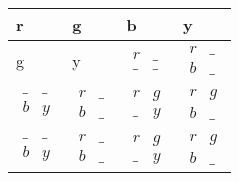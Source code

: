 \documentclass[a4paper]{article}
\begin{document}
\begin{tabular}{|l|l|l|l|}
\hline
r & g & b & y \\ \hline
g & y & $\begin{matrix}   r & \_ \\   \_ & \_  \end{matrix}$ & $\begin{matrix}   r & \_ \\   b & \_  \end{matrix}$ \\ \hline
$\begin{matrix}   \_ & \_ \\   b & y  \end{matrix}$ & $\begin{matrix}   r & \_ \\   b & \_  \end{matrix}$ & $\begin{matrix}   r & g \\   \_ & y  \end{matrix}$ & $\begin{matrix}   r & g \\   b & \_  \end{matrix}$ \\ \hline
$\begin{matrix}   \_ & \_ \\   b & y  \end{matrix}$ & $\begin{matrix}   r & \_ \\   b & \_  \end{matrix}$ & $\begin{matrix}   r & g \\   \_ & y  \end{matrix}$ & $\begin{matrix}   r & g \\   b & \_  \end{matrix}$ \\ \hline
\end{tabular}\\\\
\end{document}
